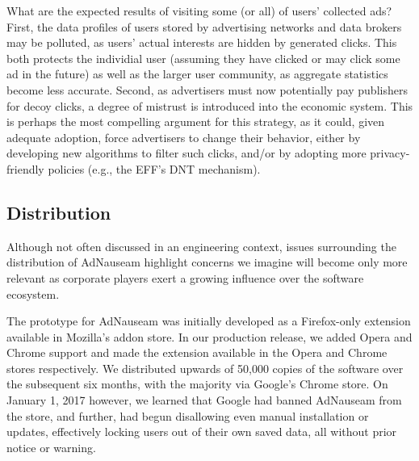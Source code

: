 \documentclass[conference]{IEEEtran}
\begin{document}
What are the expected results of visiting some (or all) of users' collected ads? First, the data profiles of users stored by advertising networks and data brokers may be polluted, as users' actual interests are hidden by generated clicks. This both protects the individial user (assuming they have clicked or may click some ad in the future) as well as the larger user community, as aggregate statistics become less accurate. Second, as advertisers must now potentially pay publishers for decoy clicks, a degree of mistrust is introduced into the economic system. This is perhaps the most compelling argument for this strategy, as it could, given adequate adoption, force advertisers to change their behavior, either by developing new algorithms to filter such clicks, and/or by adopting more privacy-friendly policies (e.g., the EFF's DNT mechanism).

\subsection{Distribution}

Although not often discussed in an engineering context, issues surrounding the distribution of AdNauseam highlight concerns we imagine will become only more relevant as corporate players exert a growing influence over the software ecosystem.

The prototype for AdNauseam was initially developed as a Firefox-only extension available in  Mozilla's addon store. In our production release, we added Opera and Chrome support and made the extension available in the Opera and Chrome stores respectively. We distributed upwards of 50,000 copies of the software over the subsequent six months, with the majority via Google's Chrome store. On January 1, 2017 however, we learned that Google had banned AdNauseam from the store, and further, had begun disallowing even manual installation or updates, effectively locking users out of their own saved data, all without prior notice or warning.
\end{document}
